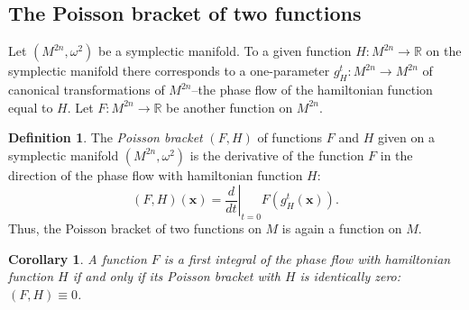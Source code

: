 \documentclass{book}
\numberwithin{equation}{section}
\theoremstyle{plain}
\newtheorem{cor}{Corollary}
\theoremstyle{definition}
\newtheorem*{defn*}{Definition}
\theoremstyle{remark}
\theoremstyle{smallcap}
\numberwithin{prob}{section}
\begin{document}
\begin{figure}[h]
  \centering
\end{figure}

\subsection{The Poisson bracket of two functions}

Let $(M^{2n}, \omega^2)$ be a symplectic manifold.
To a given function $H: M^{2n} \rightarrow \mathbb R$
on the symplectic manifold
there corresponds to a one-parameter
$g_H^t: M^{2n} \rightarrow M^{2n}$
of canonical transformations of $M^{2n}$--the
phase flow of the hamiltonian function equal to $H$.
%
Let $F: M^{2n} \rightarrow \mathbb R$
be another function on $M^{2n}$.

\begin{defn*}
  The \emph{Poisson bracket} $(F, H)$ of functions $F$ and $H$
  given on a symplectic manifold $(M^{2n}, \omega^2)$
  is the derivative of the function $F$ in the direction of
  the phase flow with hamiltonian function $H$:
  $$
  (F, H)(\mathbf x)
  =
  \left. \frac{ d }{ dt } \right|_{t = 0}
  F( g_H^t( \mathbf x ) ).
  $$
  Thus, the Poisson bracket of two functions on $M$ is again
  a function on $M$.
\end{defn*}

\begin{cor}
  A function $F$ is a first integral of the phase flow
  with hamiltonian function $H$ if and only if its Poisson bracket
  with $H$ is identically zero: $(F, H) \equiv 0$.
\end{cor}
\end{document}
